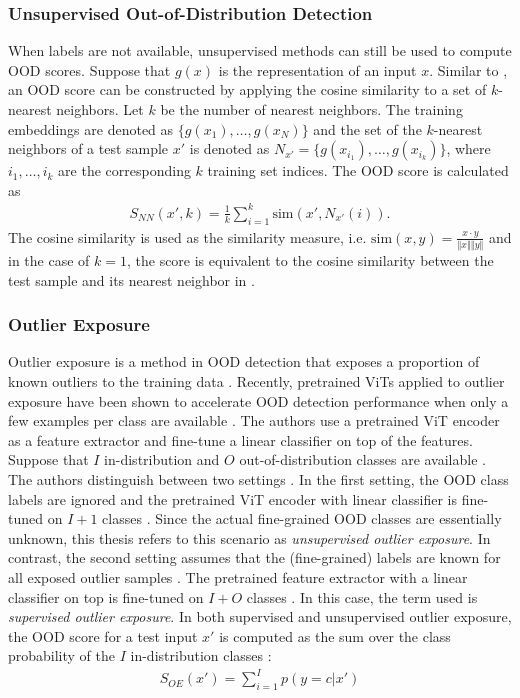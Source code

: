 \subsubsection{Unsupervised Out-of-Distribution Detection}
When labels are not available, unsupervised methods can still be used to compute OOD scores.
Suppose that $g(x)$ is the representation of an input $x$.
Similar to \citep{Michels2023,Sun2022}, an OOD score can be constructed by applying the cosine similarity to a set of $k$-nearest neighbors.
Let $k$ be the number of nearest neighbors.
The training embeddings are denoted as $\{g(x_1),\dots,g(x_N)\}$ and the set of the $k$-nearest neighbors of a test sample $x'$ is denoted as $N_{x'} = \{g(x_{i_1}),\dots,g(x_{i_k})\}$, where $i_1,\dots,i_k$ are the corresponding $k$ training set indices.
The OOD score is calculated as \citep{Michels2023,Sun2022}
\begin{align}
	S_{NN}(x',k) = \frac{1}{k}\sum_{i=1}^k \text{sim}(x',N_{x'}(i)).
	\label{equation:knn-score}
\end{align}
The cosine similarity is used as the similarity measure, i.e. $\text{sim}(x,y) = \frac{x\cdot y}{\Vert x \Vert \Vert y \Vert}$ and in the case of $k=1$, the score is equivalent to the cosine similarity between the test sample and its nearest neighbor in \citep{Michels2023}.
\subsubsection{Outlier Exposure}
Outlier exposure is a method in OOD detection that exposes a proportion of known outliers to the training data \citep{Hendrycks2018}.
Recently, pretrained ViTs applied to outlier exposure have been shown to accelerate OOD detection performance when only a few examples per class are available \citep{Fort2021}.
The authors use a pretrained ViT encoder as a feature extractor and fine-tune a linear classifier on top of the features.
Suppose that $I$ in-distribution and $O$ out-of-distribution classes are available \citep{Fort2021}.
The authors distinguish between two settings \citep{Fort2021}.
In the first setting, the OOD class labels are ignored and the pretrained ViT encoder with linear classifier is fine-tuned on $I+1$ classes \citep{Fort2021,Thulasidasan2021}.
Since the actual fine-grained OOD classes are essentially unknown, this thesis refers to this scenario as \textit{unsupervised outlier exposure}.
In contrast, the second setting assumes that the (fine-grained) labels are known for all exposed outlier samples \citep{Fort2021,Roy2021}.
The pretrained feature extractor with a linear classifier on top is fine-tuned on $I+O$ classes \citep{Fort2021}.
In this case, the term used is \textit{supervised outlier exposure}.
In both supervised and unsupervised outlier exposure, the OOD score for a test input $x'$ is computed as the sum over the class probability of the $I$ in-distribution classes \citep{Fort2021}:
\begin{align}
	S_{OE}(x') = \sum_{i=1}^{I}p(y=c|x') 
\end{align}
